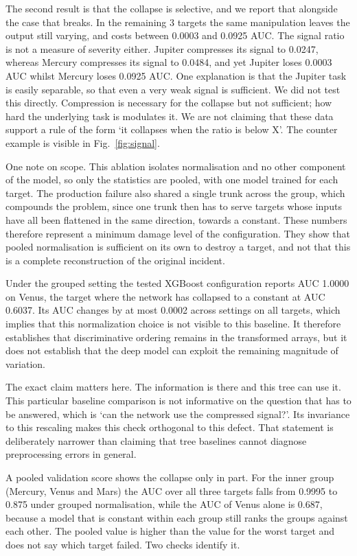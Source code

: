 \documentclass[preprint,12pt,authoryear,doubleblind]{elsarticle}
\begin{document}
The second result is that the collapse is selective, and we report that alongside the case that breaks. In the remaining 3 targets the same manipulation leaves the output still varying, and costs between 0.0003 and 0.0925 AUC. The signal ratio is not a measure of severity either. Jupiter compresses its signal to 0.0247, whereas Mercury compresses its signal to 0.0484, and yet Jupiter loses 0.0003 AUC whilst Mercury loses 0.0925 AUC. One explanation is that the Jupiter task is easily separable, so that even a very weak signal is sufficient. We did not test this directly. Compression is necessary for the collapse but not sufficient; how hard the underlying task is modulates it. We are not claiming that these data support a rule of the form `it collapses when the ratio is below X'. The counter example is visible in Fig.~\ref{fig:signal}.

One note on scope. This ablation isolates normalisation and no other component of the model, so only the statistics are pooled, with one model trained for each target. The production failure also shared a single trunk across the group, which compounds the problem, since one trunk then has to serve targets whose inputs have all been flattened in the same direction, towards a constant. These numbers therefore represent a minimum damage level of the configuration. They show that pooled normalisation is sufficient on its own to destroy a target, and not that this is a complete reconstruction of the original incident.

Under the grouped setting the tested XGBoost configuration reports AUC 1.0000 on Venus, the target where the network has collapsed to a constant at AUC 0.6037. Its AUC changes by at most 0.0002 across settings on all targets, which implies that this normalization choice is not visible to this baseline. It therefore establishes that discriminative ordering remains in the transformed arrays, but it does not establish that the deep model can exploit the remaining magnitude of variation.

The exact claim matters here. The information is there and this tree can use it. This particular baseline comparison is not informative on the question that has to be answered, which is `can the network use the compressed signal?'. Its invariance to this rescaling makes this check orthogonal to this defect. That statement is deliberately narrower than claiming that tree baselines cannot diagnose preprocessing errors in general.

A pooled validation score shows the collapse only in part. For the inner group (Mercury, Venus and Mars) the AUC over all three targets falls from 0.9995 to 0.875 under grouped normalisation, while the AUC of Venus alone is 0.687, because a model that is constant within each group still ranks the groups against each other. The pooled value is higher than the value for the worst target and does not say which target failed. Two checks identify it.
\end{document}
